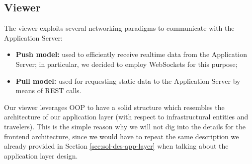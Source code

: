 \subsection{Viewer}

The viewer exploits several networking paradigms to communicate with the
Application Server:

\begin{itemize}
  \item \textbf{Push model:} used to efficiently receive realtime data from
    the Application Server; in particular, we decided to employ WebSockets
    for this purpose;
  \item \textbf{Pull model:} used for requesting static data to the
    Application Server by means of REST calls.
\end{itemize}

Our viewer leverages OOP to have a solid structure which resembles the
architecture of our application layer (with respect to infrastructural
entities and travelers). This is the simple reason why we will not dig into
the details for the frontend architecture, since we would have to repeat the
same description we already provided in Section \ref{sec:sol-des-app-layer}
when talking about the application layer design.
